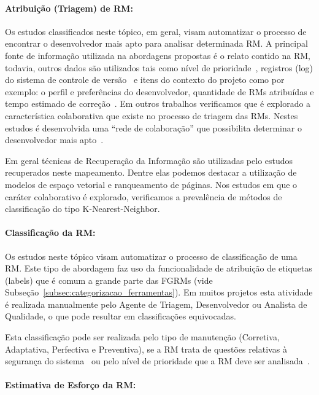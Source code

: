 \paragraph{Atribuição (Triagem) de RM:}
Os estudos classificados neste tópico, em geral, visam automatizar o processo de
encontrar o desenvolvedor mais apto para analisar determinada RM\@. A principal
fonte de informação utilizada na abordagens propostas é o relato contido na RM,
todavia, outros dados são utilizados tais como nível de
prioridade~\cite{tian2015automated}, registros (log) do sistema de controle de
versão~\cite{shokripour2012automatic, Hu:2014:EBT:2707683.2708297} e itens do
contexto do projeto como por exemplo: o perfil e preferências do desenvolvedor,
quantidade de RMs atribuídas e tempo estimado de
correção~\cite{hosseini2012market}. Em outros trabalhos verificamos que é
explorado a característica colaborativa que existe no processo de triagem das
RMs. Nestes estudos é desenvolvida uma ``rede de colaboração'' que possibilita
determinar o desenvolvedor mais apto~\cite{Zhang2014,Zanetti2013, Wu2011}.

Em geral técnicas de Recuperação da Informação são utilizadas pelo estudos
recuperados neste mapeamento. Dentre elas podemos destacar a utilização de
modelos de espaço vetorial e ranqueamento de páginas. Nos estudos em que o
caráter colaborativo é explorado, verificamos a prevalência de métodos de
classificação do tipo K-Nearest-Neighbor.

\paragraph{Classificação da RM:}

Os estudos neste tópico visam automatizar o processo de clas\-si\-fi\-ca\-ção de
uma RM\@.  Este tipo de abordagem faz uso da funcionalidade de atribuição de
etiquetas (labels) que é comum  a grande parte das FGRMs (vide
Subseção~\ref{subsec:categorizacao_ferramentas}).  Em muitos projetos esta
atividade é realizada manualmente pelo Agente de Triagem, Desenvolvedor ou
Analista de Qualidade, o que pode resultar em classificações equivocadas.

Esta classificação pode ser realizada pelo tipo de manutenção (Corretiva,
Adaptativa, Perfectiva e Preventiva), se a RM trata de questões relativas à
segurança do sistema~\cite{gegick2010identifying, behl2014bug} ou pelo nível de
prioridade que a RM deve ser analisada~\cite{behl2014bug}.

\paragraph{Estimativa de Esforço da RM:}

